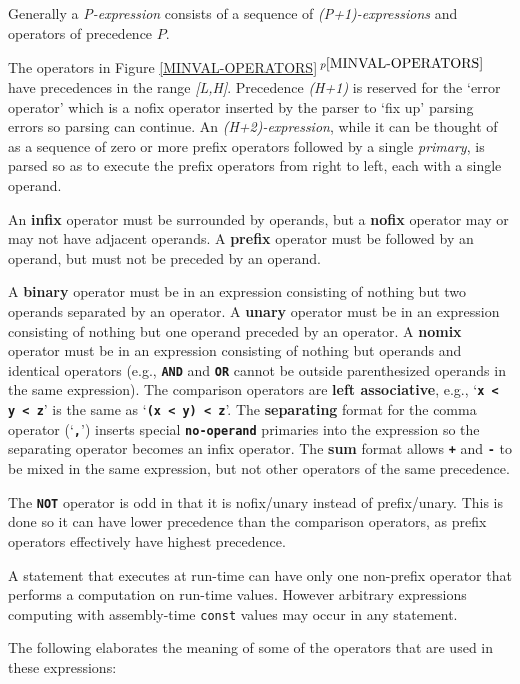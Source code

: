 \documentclass[12pt]{article}
\newcommand{\TT}[1]{{\tt \bfseries #1}}
\newcommand{\key}[1]{{\rm \bfseries #1}}
\newcommand{\itemref}[1]{\ref{#1}$\,^{p\pageref{#1}}$}
\begin{document}
Generally
a {\em P-expression} consists of a sequence of {\em (P+1)-expressions}
and operators of precedence $P$.

The operators in Figure \itemref{MINVAL-OPERATORS} have precedences in
the range {\em [L,H]}.
Precedence {\em (H+1)} is reserved for the `error operator' which is a
nofix operator inserted by the parser to `fix up' parsing errors
so parsing can continue.
An {\em (H+2)-expression}, while it can be thought of as a sequence
of zero or more prefix operators followed by a single {\em primary},
is parsed so as to execute the prefix operators from right to left, each
with a single operand.

An \key{infix} operator must be surrounded by operands,
but a \key{nofix} operator
may or may not have adjacent operands.  A \key{prefix} operator must be followed
by an operand, but must not be preceded by an operand.

A \key{binary} operator must be in an expression consisting of nothing
but two operands separated by an operator.
A \key{unary} operator must be in an expression consisting of nothing
but one operand preceded by an operator.
A \key{nomix} operator must be in an expression consisting of nothing
but operands and identical operators (e.g., \TT{AND} and \TT{OR}
cannot be outside parenthesized operands in the same expression).
The comparison operators are \key{left associative}, e.g.,
`\TT{x < y < z}' is the same as `\TT{(x < y) < z}'.
The \key{separating} format for the comma operator (`\TT{,}')
inserts special \TT{no-operand} primaries
into the expression so the separating operator becomes an infix
operator.  The \key{sum} format allows \TT{+} and \TT{-} to be mixed
in the same expression, but not other operators of the same
precedence.

The \TT{NOT} operator is odd in that it is nofix/unary instead of
prefix/unary.  This is done so it can have lower precedence than
the comparison operators, as prefix operators effectively have highest
precedence.

A statement that executes at run-time
can have only one non-prefix
operator that performs a computation on run-time values.
However arbitrary expressions computing with assembly-time {\tt const} values
may occur in any statement.

The following elaborates the meaning of some of the operators
that are used in these expressions:
\end{document}
